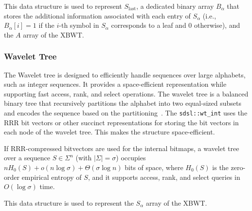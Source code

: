 This data structure is used to represent $S_{\text{last}}$, a dedicated binary array $B_{\alpha}$ that stores the additional information associated with each entry of $S_{\alpha}$ (i.e., $B_{\alpha}[i]=1$ if the $i$-th symbol in $S_{\alpha}$ corresponds to a leaf and $0$ otherwise), and the $A$ array of the XBWT.

\subsubsection{Wavelet Tree}
The Wavelet tree is designed to efficiently handle sequences over large alphabets, such as integer sequences. It provides a space-efficient representation while supporting fast access, rank, and select operations. The wavelet tree is a balanced binary tree that recursively partitions the alphabet into two equal-sized subsets and encodes the sequence based on the partitioning~\cite{grossi2003high}. The \texttt{sdsl::wt\_int} uses the RRR bit vectors or other succinct representations for storing the bit vectors in each node of the wavelet tree. This makes the structure space-efficient.

If RRR-compressed bitvectors are used for the internal bitmaps, a wavelet tree over a sequence $S \in \Sigma^n$ (with $|\Sigma|=\sigma$) occupies $n H_0(S) + o(n \log \sigma) + \Theta(\sigma \log n)$ bits of space, where $H_0(S)$ is the zero-order empirical entropy of $S$, and it supports access, rank, and select queries in $O(\log \sigma)$ time.

This data structure is used to represent the $S_\alpha$ array of the XBWT.

